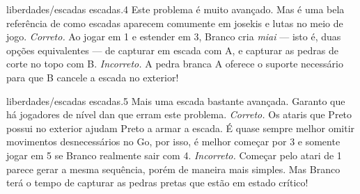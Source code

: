 \problemAnswerDiagram
  {liberdades/escadas}
  {escadas.4}
  {Este problema é muito avançado. Mas é uma bela referência de como escadas aparecem comumente em josekis e lutas no meio de jogo.}
  {\emph{Correto.} Ao jogar em 1 e estender em 3, Branco cria  \emph{miai} --- isto é, duas opções equivalentes --- de capturar em escada com A, e capturar as pedras de corte no topo com B.}
  {\emph{Incorreto.} A pedra branca A oferece o suporte necessário para que B cancele a escada no exterior!}

\problemAnswerDiagram
  {liberdades/escadas}
  {escadas.5}
  {Mais uma escada bastante avançada. Garanto que há jogadores de nível dan que erram este problema.}
  {\emph{Correto.} Os ataris que Preto possui no exterior ajudam Preto a armar a escada. É quase sempre melhor omitir movimentos desnecessários no Go, por isso, é melhor começar por 3 e somente jogar em 5 se Branco realmente sair com 4.}
  {\emph{Incorreto.} Começar pelo atari de 1 parece gerar a mesma sequência, porém de maneira mais simples. Mas Branco terá o tempo de capturar as pedras pretas que estão em estado crítico!}
